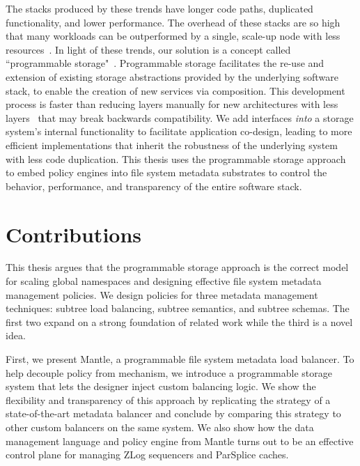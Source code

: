 The stacks produced by these trends have longer code paths, duplicated
functionality, and lower performance.  The overhead of these stacks are so
high that many workloads can be outperformed by a single, scale-up node with
less resources~\cite{sevilla:discs2013-framework,
rowstron:hotcdp2012-hadoop-vs-single-node, schwarzkopf:hotcloud2012-7-sins,
gigaspaces:whitepaper2011-su-vs-so, michael:2007pdps-scale-up-x-scale-out}.  In
light of these trends, our solution is a concept called ``programmable
storage"~\cite{sevilla:eurosys17-malacology, watkins:hot17-declstor}.
Programmable storage facilitates the re-use and extension of existing storage
abstractions provided by the underlying software stack, to enable the creation
of new services via composition. This development process is faster than
reducing layers manually for new architectures with less
layers~\cite{bent:login16-hpc-trends} that may break backwards compatibility.
We add interfaces {\it into} a storage system's internal functionality to
facilitate application co-design, leading to more efficient implementations
that inherit the robustness of the underlying system with less code
duplication. This thesis uses the programmable storage approach to embed policy
engines into file system metadata substrates to control the behavior,
performance, and transparency of the entire software stack.

\section{Contributions}

This thesis argues that the programmable storage approach is the correct model
for scaling global namespaces and designing effective file system
metadata management policies. We design policies for three metadata management
techniques: subtree load balancing, subtree semantics, and subtree schemas.
The first two expand on a strong foundation of related work while the third is
a novel idea.

First, we present Mantle, a programmable file system metadata load balancer.
To help decouple policy from mechanism, we introduce a programmable storage
system that lets the designer inject custom balancing logic. We show the
flexibility and transparency of this approach by replicating the strategy of a
state-of-the-art metadata balancer and conclude by comparing this strategy to
other custom balancers on the same system. We also show how the data management
language and policy engine from Mantle turns out to be an effective control
plane for managing ZLog sequencers and ParSplice caches.  

